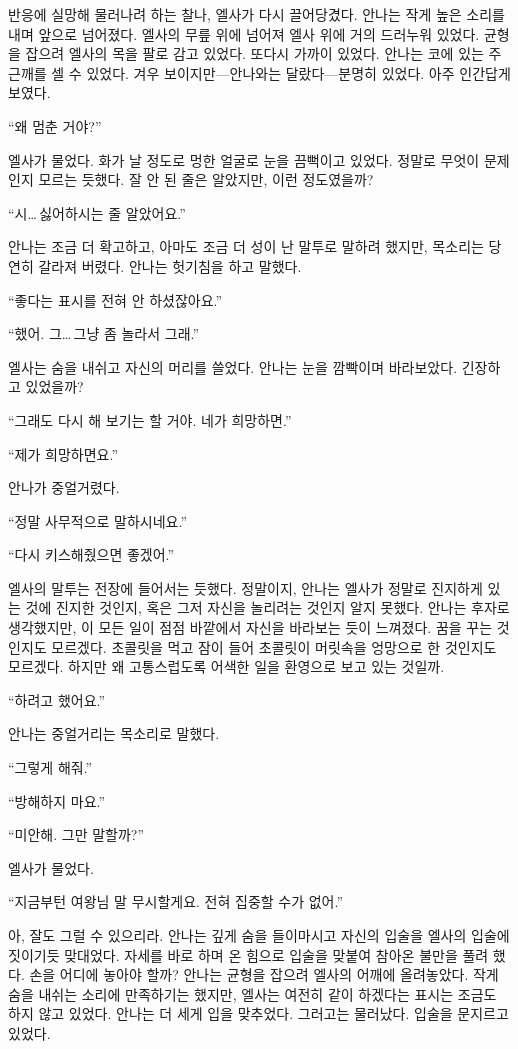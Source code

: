 반응에 실망해 물러나려 하는 찰나, 엘사가 다시 끌어당겼다. 안나는 작게 높은 소리를 내며 앞으로 넘어졌다. 엘사의 무릎 위에 넘어져 엘사 위에 거의 드러누워 있었다. 균형을 잡으려 엘사의 목을 팔로 감고 있었다. 또다시 가까이 있었다. 안나는 코에 있는 주근깨를 셀 수 있었다. 겨우 보이지만—안나와는 달랐다—분명히 있었다. 아주 인간답게 보였다.

``왜 멈춘 거야?''

엘사가 물었다. 화가 날 정도로 멍한 얼굴로 눈을 끔뻑이고 있었다. 정말로 무엇이 문제인지 모르는 듯했다. 잘 안 된 줄은 알았지만, 이런 정도였을까?

``시\ldots\,싫어하시는 줄 알았어요.''

안나는 조금 더 확고하고, 아마도 조금 더 성이 난 말투로 말하려 했지만, 목소리는 당연히 갈라져 버렸다. 안나는 헛기침을 하고 말했다.

``좋다는 표시를 전혀 안 하셨잖아요.''

``했어. 그\ldots\,그냥 좀 놀라서 그래.''

엘사는 숨을 내쉬고 자신의 머리를 쓸었다. 안나는 눈을 깜빡이며 바라보았다. 긴장하고 있었을까?

``그래도 다시 해 보기는 할 거야. 네가 희망하면.''

``제가 희망하면요.''

안나가 중얼거렸다.

``정말 사무적으로 말하시네요.''

``다시 키스해줬으면 좋겠어.''

엘사의 말투는 전장에 들어서는 듯했다. 정말이지, 안나는 엘사가 정말로 진지하게 있는 것에 진지한 것인지, 혹은 그저 자신을 놀리려는 것인지 알지 못했다. 안나는 후자로 생각했지만, 이 모든 일이 점점 바깥에서 자신을 바라보는 듯이 느껴졌다. 꿈을 꾸는 것인지도 모르겠다. 초콜릿을 먹고 잠이 들어 초콜릿이 머릿속을 엉망으로 한 것인지도 모르겠다. 하지만 왜 고통스럽도록 어색한 일을 환영으로 보고 있는 것일까.

``하려고 했어요.''

안나는 중얼거리는 목소리로 말했다.

``그렇게 해줘.''

``방해하지 마요.''

``미안해. 그만 말할까?''

엘사가 물었다.

``지금부턴 여왕님 말 무시할게요. 전혀 집중할 수가 없어.''

아, 잘도 그럴 수 있으리라. 안나는 깊게 숨을 들이마시고 자신의 입술을 엘사의 입술에 짓이기듯 맞대었다. 자세를 바로 하며 온 힘으로 입술을 맞붙여 참아온 불만을 풀려 했다. 손을 어디에 놓아야 할까? 안나는 균형을 잡으려 엘사의 어깨에 올려놓았다. 작게 숨을 내쉬는 소리에 만족하기는 했지만, 엘사는 여전히 같이 하겠다는 표시는 조금도 하지 않고 있었다. 안나는 더 세게 입을 맞추었다. 그러고는 물러났다. 입술을 문지르고 있었다.

